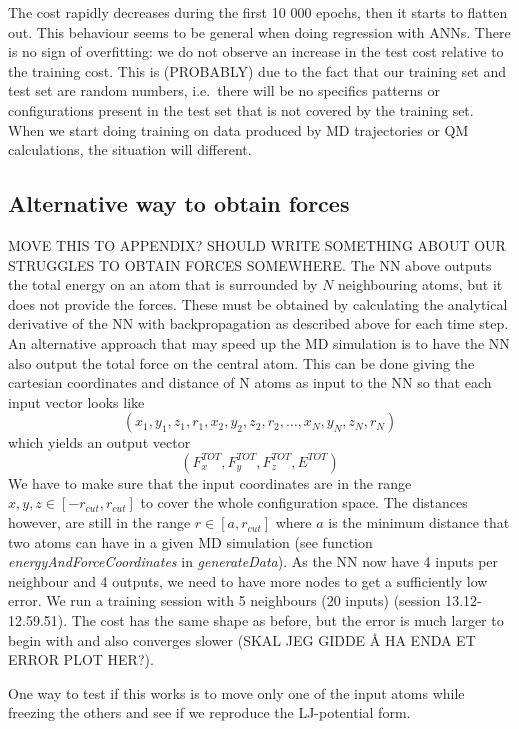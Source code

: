 \documentclass[twoside,english]{uiofysmaster}
\begin{document}
The cost rapidly decreases during the first 10 000 epochs, then it starts to flatten out. This behaviour seems
to be general when doing regression with ANNs. 
There is no sign of overfitting: we do not observe an increase in the test cost relative to the training cost. 
This is (PROBABLY) due to the fact that our training set and test set are random numbers, i.e.\ there will be no 
specifics patterns or configurations present in the test set that is not covered by the training set. 
When we start doing training on data produced by MD trajectories or QM calculations, the situation will different.

\subsection{Alternative way to obtain forces}
MOVE THIS TO APPENDIX? SHOULD WRITE SOMETHING ABOUT OUR STRUGGLES TO OBTAIN FORCES SOMEWHERE. 
The NN above outputs the total energy on an atom that is surrounded by $N$ neighbouring atoms, but it does not provide the forces. 
These must be obtained by calculating the analytical derivative of the NN with backpropagation as described above for each time step.
An alternative approach that may speed up the MD simulation is to have the NN also output the total force on the central atom. 
This can be done giving the cartesian coordinates and distance of N atoms as input to the NN so that each input
vector looks like
\begin{equation}
 (x_1, y_1, z_1, r_1, x_2, y_2, z_2, r_2, \dots, x_N, y_N, z_N, r_N)
\end{equation}
which yields an output vector
\begin{equation}
 (F_x^{TOT}, F_y^{TOT}, F_z^{TOT}, E^{TOT})
\end{equation}
We have to make sure that the input coordinates are in the range 
$x, y, z \in [-r_{cut}, r_{cut}]$ to cover the whole configuration space. The distances however, are still in the range
$r \in [a, r_{cut}]$ where $a$ is the minimum distance that two atoms can have in a given MD simulation (see function
\textit{energyAndForceCoordinates} in \textit{generateData}). As the NN now have 4 inputs per neighbour and 4 outputs, 
we need to have more nodes to get a sufficiently low error. We run a training session with 5 neighbours (20 inputs) 
(session 13.12-12.59.51). The cost has the same shape as before, but the error is much larger to begin with and also converges
slower (SKAL JEG GIDDE Å HA ENDA ET ERROR PLOT HER?).

One way to test if this works is to move only one of the input atoms while freezing the others and see if we reproduce
the LJ-potential form. 
\end{document}
